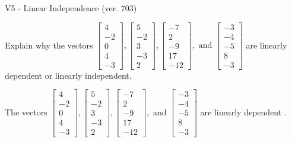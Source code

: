 \begin{exercise}
  \begin{exerciseTitle}V5 - Linear Independence (ver. 703)\end{exerciseTitle}
  \begin{exerciseStatement}
    Explain why the vectors \(\left[\begin{array}{r}
4 \\
-2 \\
0 \\
4 \\
-3
\end{array}\right] , \left[\begin{array}{r}
5 \\
-2 \\
3 \\
-3 \\
2
\end{array}\right] , \left[\begin{array}{r}
-7 \\
2 \\
-9 \\
17 \\
-12
\end{array}\right] , \text{ and } \left[\begin{array}{r}
-3 \\
-4 \\
-5 \\
8 \\
-3
\end{array}\right]\) are linearly dependent or linearly independent.	


  \end{exerciseStatement}
  \begin{exerciseAnswer}
   The vectors \(\left[\begin{array}{r}
4 \\
-2 \\
0 \\
4 \\
-3
\end{array}\right] , \left[\begin{array}{r}
5 \\
-2 \\
3 \\
-3 \\
2
\end{array}\right] , \left[\begin{array}{r}
-7 \\
2 \\
-9 \\
17 \\
-12
\end{array}\right] , \text{ and } \left[\begin{array}{r}
-3 \\
-4 \\
-5 \\
8 \\
-3
\end{array}\right]\) are 
  	 linearly dependent  .
  


  \end{exerciseAnswer}
\end{exercise}
